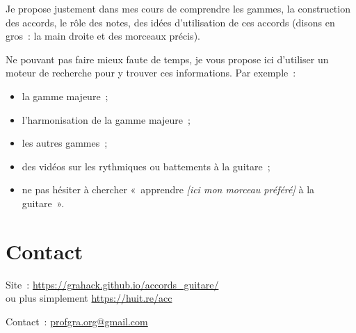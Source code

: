 \documentclass[11pt]{article}
\begin{document}
Je propose justement dans mes cours de comprendre les gammes, la construction
des accords, le rôle des notes, des idées d’utilisation de ces accords (disons
en gros~: la main droite et des morceaux précis).

Ne pouvant pas faire mieux faute de temps, je vous propose ici d’utiliser un
moteur de recherche pour y trouver ces informations. Par exemple~:

\begin{itemize}
\item la gamme majeure~;
\item l’harmonisation de la gamme majeure~;
\item les autres gammes~;
\item des vidéos sur les rythmiques ou battements à la guitare~;
\item ne pas hésiter à chercher «~apprendre \textit{[ici mon morceau préféré]}
       à la guitare~».
\end{itemize}

\section{Contact} \label{contact}

\setlength{\parindent}{0pt}

Site~: \url{https://grahack.github.io/accords_guitare/} \\
ou plus simplement \url{https://huit.re/acc}

Contact~: \url{profgra.org@gmail.com}
\end{document}
